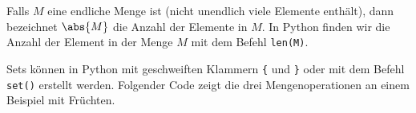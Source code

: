 \begin{itemize}
\begin{center}
	      \end{center}
\end{itemize}

Falls $M$ eine endliche Menge ist (nicht unendlich viele Elemente enthält), dann bezeichnet $\abs{M}$ die Anzahl der Elemente in $M$. In Python finden wir die Anzahl der Element in der Menge $M$ mit dem Befehl \lstinline|len(M)|.

\begin{myexample}
Sets können in Python mit geschweiften Klammern \lstinline|{| und \lstinline|}| oder mit dem Befehl \lstinline|set()| erstellt werden. Folgender Code zeigt die drei Mengenoperationen an einem Beispiel mit Früchten.

\end{myexample}

